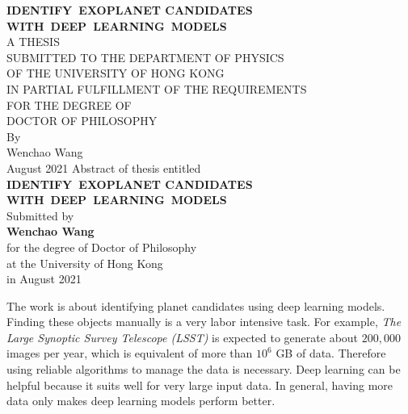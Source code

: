 \begin{titlepage}
  \begin{center}
  \vspace*{3cm}
  \Large \textbf{IDENTIFY EXOPLANET CANDIDATES \\[0.5cm]WITH DEEP LEARNING MODELS\\[0.5cm]}
  \small
    A THESIS \\[0.5cm] 
    SUBMITTED TO THE DEPARTMENT OF PHYSICS \\[0.5cm]
    OF THE UNIVERSITY OF HONG KONG \\[0.5CM]
    IN PARTIAL FULFILLMENT OF THE REQUIREMENTS \\[0.5cm]
    FOR THE DEGREE OF \\[0.5cm]
    DOCTOR OF PHILOSOPHY \\[4.2cm]

    By \\[0.5cm]
    \large Wenchao Wang \\[0.5cm]
    August 2021
    \newpage 
    \centering 
    Abstract of thesis entitled \\[1.2cm]
    \Large \textbf{IDENTIFY EXOPLANET CANDIDATES \\[0.5cm]WITH DEEP LEARNING MODELS\\[0.5cm]}
    \normalsize Submitted by \\ [0.5cm]
    \Large \textbf{Wenchao Wang} \\[1cm]
    \normalsize for the degree of Doctor of Philosophy \\[0.5cm]
    at the University of Hong Kong \\[0.5cm]
    in August 2021 \\[1.9cm]
  \end{center}

    \doublespacing
    \noindent The work is about identifying planet candidates using deep learning models.
Finding these objects manually is a very labor intensive task.
For example, \textit{The Large
    Synoptic Survey Telescope (LSST)} is expected to generate about
$200,000$ images per year, which is equivalent of more than
$10^{6}$ GB of data. Therefore using reliable algorithms to
manage the data is necessary. Deep learning can be helpful
because it suits well for very large input data. In general,
having more data only makes deep learning models perform better.

\vspace{\baselineskip}


\end{titlepage}
